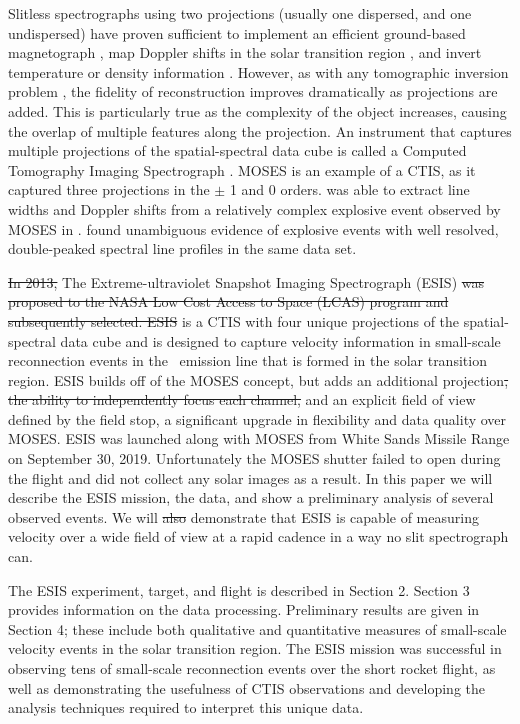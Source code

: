     Slitless spectrographs using two projections (usually one dispersed, and one undispersed) have proven sufficient to implement an efficient ground-based magnetograph \citep{DeforestStereoscopy2004}, map Doppler shifts in the solar transition region \citep{Courrier2018}, and invert temperature or density information \citep{winebarger2019}. 
    However, as with any tomographic inversion problem \citep[e.g.,][]{KakSlaney2001}, the fidelity of reconstruction improves dramatically as projections are added. 
    This is particularly true as the complexity of the object increases, causing the overlap of multiple features along the projection. 
    An instrument that captures multiple projections of the spatial-spectral data cube is called a Computed Tomography Imaging Spectrograph  \cite[CTIS,][]{DescourDereniakCTIS1995}.  
    MOSES is an example of a CTIS, as it captured three projections in the $\pm$ 1 and 0 orders.  
    \cite{Fox2010} was able to extract line widths and Doppler shifts from a relatively complex explosive event observed by MOSES in \heii.  
    \cite{Rust2019} found unambiguous evidence of explosive events with well resolved, double-peaked spectral line profiles in the same data set.
    
    \sout{In 2013,} The Extreme-ultraviolet Snapshot Imaging Spectrograph (ESIS) \sout{was proposed to the NASA Low Cost Access to Space (LCAS) program and subsequently selected.  
    ESIS} is a CTIS with four unique projections of the spatial-spectral data cube and is designed to capture velocity information in small-scale reconnection events in the \ov \ emission line that is formed in the solar transition region. 
    ESIS builds off of the MOSES concept, but adds an additional projection\sout{, the ability to independently focus each channel,} and an explicit field of view defined by the field stop, a significant upgrade in flexibility and data quality over MOSES.
    ESIS was launched along with MOSES from White Sands Missile Range on September 30,  2019.
    Unfortunately the MOSES shutter failed to open during the flight and did not collect any solar images as a result.
    In this paper we will describe the ESIS mission, the data, and show a preliminary analysis of several observed events.
    We will \sout{also} demonstrate that ESIS is capable of measuring velocity over a wide field of view at a rapid cadence in a way no slit spectrograph can.
    
    The ESIS experiment, target, and flight is described in Section 2.  
    Section 3 provides information on the data processing.  
    Preliminary results are given in Section 4; these include both qualitative and quantitative measures of small-scale velocity events in the solar transition region.  
    The ESIS mission was successful in  observing tens of small-scale reconnection events over the short rocket flight, as well as demonstrating the usefulness of CTIS observations and developing the analysis techniques required to interpret this unique data.


